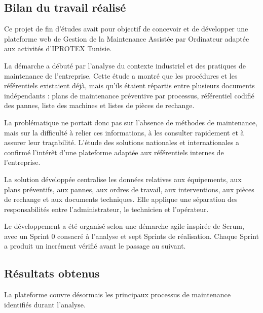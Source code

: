 \subsection*{Bilan du travail réalisé}

Ce projet de fin d’études avait pour objectif de concevoir et de développer une plateforme web de Gestion de la Maintenance Assistée par Ordinateur adaptée aux activités d’IPROTEX Tunisie.

La démarche a débuté par l’analyse du contexte industriel et des pratiques de maintenance de l’entreprise. Cette étude a montré que les procédures et les référentiels existaient déjà, mais qu’ils étaient répartis entre plusieurs documents indépendants : plans de maintenance préventive par processus, référentiel codifié des pannes, liste des machines et listes de pièces de rechange.

La problématique ne portait donc pas sur l’absence de méthodes de maintenance, mais sur la difficulté à relier ces informations, à les consulter rapidement et à assurer leur traçabilité. L’étude des solutions nationales et internationales a confirmé l’intérêt d’une plateforme adaptée aux référentiels internes de l’entreprise.

La solution développée centralise les données relatives aux équipements, aux plans préventifs, aux pannes, aux ordres de travail, aux interventions, aux pièces de rechange et aux documents techniques. Elle applique une séparation des responsabilités entre l’administrateur, le technicien et l’opérateur.

Le développement a été organisé selon une démarche agile inspirée de Scrum, avec un Sprint 0 consacré à l’analyse et sept Sprints de réalisation. Chaque Sprint a produit un incrément vérifié avant le passage au suivant.

\subsection*{Résultats obtenus}

La plateforme couvre désormais les principaux processus de maintenance identifiés durant l’analyse.

